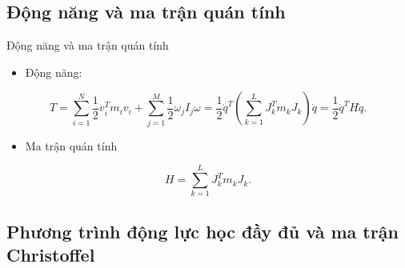 \subsection{Động năng và ma trận quán tính}

\begin{frame}{Động năng và ma trận quán tính}
    \begin{itemize}
        \item Động năng:
    \end{itemize}
    \begin{equation}
        T = \sum_{i=1}^N \dfrac{1}{2} v_i^T m_i v_i + \sum_{j=1}^M \dfrac{1}{2} \omega_j I_j \omega = \dfrac{1}{2} \dot{q}^T \left( \sum_{k=1}^L J_k^T m_k J_k \right) \dot{q} = \dfrac{1}{2} \dot{q}^T H \dot{q}.
    \end{equation}
    \begin{itemize}
        \item Ma trận quán tính
    \end{itemize}
    \begin{equation}
        H = \sum_{k=1}^L J_k^T m_k J_k.
    \end{equation}
\end{frame}

\subsection{Phương trình động lực học đầy đủ và ma trận Christoffel}

